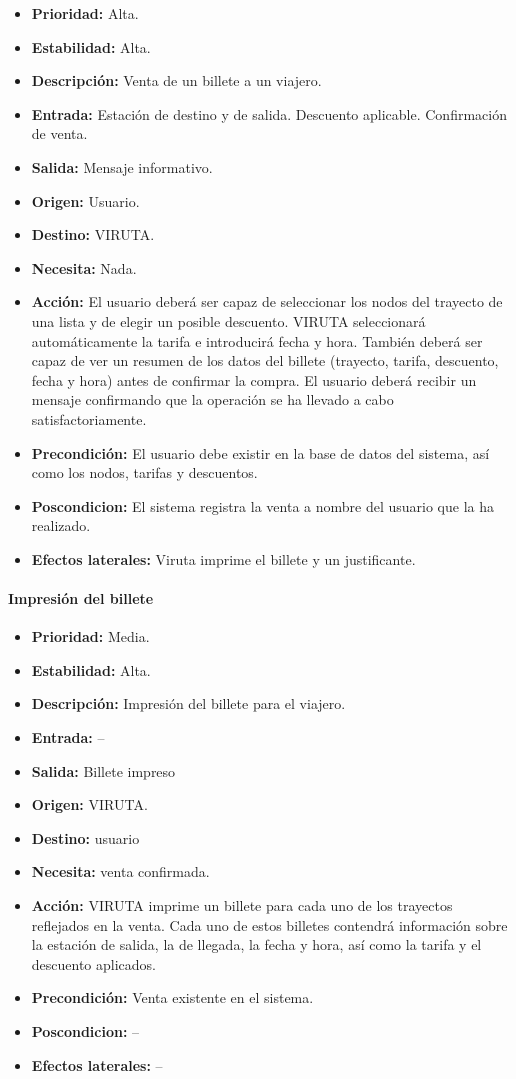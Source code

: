 \begin{itemize}
\item \textbf{Prioridad:} Alta.
\item \textbf{Estabilidad:} Alta.
\item \textbf{Descripción:} Venta de un billete a un viajero.
\item \textbf{Entrada:} Estación de destino y de salida. Descuento aplicable. Confirmación de venta.
\item \textbf{Salida:} Mensaje informativo.
\item \textbf{Origen:} Usuario.
\item \textbf{Destino:} VIRUTA.
\item \textbf{Necesita:} Nada.
\item \textbf{Acción:} El usuario deberá ser capaz de seleccionar los nodos del trayecto de una lista y de elegir un posible descuento. VIRUTA seleccionará automáticamente la tarifa e introducirá fecha y hora. También deberá ser capaz de ver un resumen de los datos del billete (trayecto, tarifa, descuento, fecha y hora) antes de confirmar la compra. El usuario deberá recibir un mensaje confirmando que la operación se ha llevado a cabo satisfactoriamente.
\item \textbf{Precondición:} El usuario debe existir en la base de datos del sistema, así como los nodos, tarifas y descuentos.
\item \textbf{Poscondicion:} El sistema registra la venta a nombre del usuario que la ha realizado.
\item \textbf{Efectos laterales:} Viruta imprime el billete y un justificante.
\end{itemize}

\paragraph{Impresión del billete}

\begin{itemize}
\item \textbf{Prioridad:} Media.
\item \textbf{Estabilidad:} Alta.
\item \textbf{Descripción:} Impresión del billete para el viajero.
\item \textbf{Entrada:} --
\item \textbf{Salida:} Billete impreso
\item \textbf{Origen:} VIRUTA.
\item \textbf{Destino:} usuario
\item \textbf{Necesita:} venta confirmada.
\item \textbf{Acción:} VIRUTA imprime un billete para cada uno de los trayectos reflejados en la venta. Cada uno de estos billetes contendrá información sobre la estación de salida, la de llegada, la fecha y hora, así como la tarifa y el descuento aplicados.
\item \textbf{Precondición:} Venta existente en el sistema.
\item \textbf{Poscondicion:} --
\item \textbf{Efectos laterales:} --
\end{itemize}

